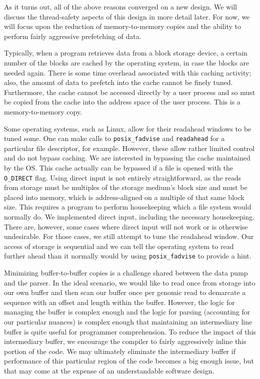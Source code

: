 \documentclass{article}
\begin{document}
As it turns out, all of the above reasons converged on a new design. We will discuss the thread-safety aspects of this design in more detail later. For now, we will focus upon the reduction of memory-to-memory copies and the ability to perform fairly aggressive prefetching of data.

Typically, when a program retrieves data from a block storage device, a certain number of the blocks are cached by the operating system, in case the blocks are needed again. There is some time overhead associated with this caching activity; also, the amount of data to prefetch into the cache cannot be finely tuned. Furthermore, the cache cannot be accessed directly by a user process and so must be copied from the cache into the address space of the user process. This is a memory-to-memory copy. 

Some operating systems, such as Linux, allow for their readahead windows to be tuned some. One can make calls to \texttt{posix\_fadvise} and \texttt{readahead} for a particular file descriptor, for example. However, these allow rather limited control and do not bypass caching. We are interested in bypassing the cache maintained by the OS. This cache actually can be bypassed if a file is opened with the \texttt{O\_DIRECT} flag. Using direct input is not entirely straightforward, as the reads from storage must be multiples of the storage medium's block size and must be placed into memory, which is address-aligned on a multiple of that same block size. This requires a program to perform housekeeping which a file system would normally do. We implemented direct input, including the necessary housekeeping. There are, however, some cases where direct input will not work or is otherwise undesirable. For those cases, we still attempt to tune the readahead window. Our access of storage is sequential and we can tell the operating system to read further ahead than it normally would by using \texttt{posix\_fadvise} to provide a hint.

Minimizing buffer-to-buffer copies is a challenge shared between the data pump and the parser. In the ideal scenario, we would like to read once from storage into our own buffer and then scan our buffer once per genomic read to demarcate a sequence with an offset and length within the buffer. However, the logic for managing the buffer is complex enough and the logic for parsing (accounting for our particular nuances) is complex enough that maintaining an intermediary line buffer is quite useful for programmer comprehension. To reduce the impact of this intermediary buffer, we encourage the compiler to fairly aggressively inline this portion of the code. We may ultimately eliminate the intermediary buffer if performance of this particular region of the code becomes a big enough issue, but that may come at the expense of an understandable software design.
\end{document}
